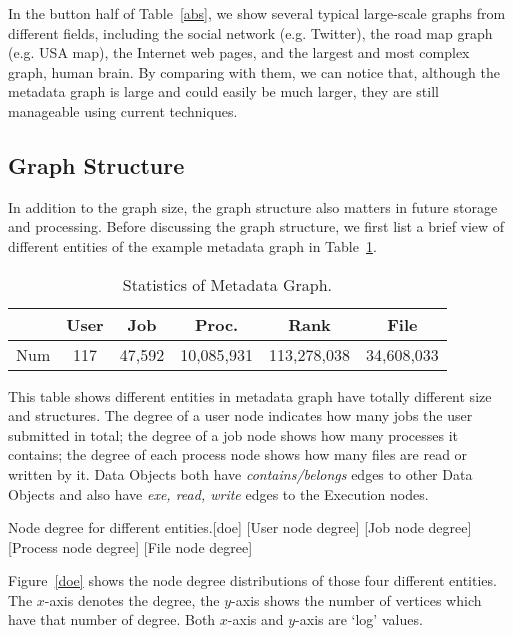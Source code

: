 In the button half of Table~\ref{abs}, we show several typical large-scale graphs from different fields, including the social network (e.g. Twitter), the road map graph (e.g. USA map), the Internet web pages, and the largest and most complex graph, human brain. By comparing with them, we can notice that, although the metadata graph is large and could easily be much larger, they are still manageable using current techniques.

\subsection{Graph Structure}
In addition to the graph size, the graph structure also matters in future storage and processing. Before discussing the graph structure, we first list a brief view of different entities of the example metadata graph in Table~\ref{smg}.

\begin{table}[h]
\caption{Statistics of Metadata Graph.}
  \label{smg}
\centering
\begin{tabular}{|c|c|c|c|c|c|}
\hline
 & User  & Job  & Proc.   & Rank     & File     \\ \hline
 Num & 117      & 47,592  & 10,085,931 & 113,278,038 & 34,608,033 \\ \hline
\end{tabular}
\end{table}

This table shows different entities in metadata graph have totally different size and structures. The degree of a user node indicates how many jobs the user submitted in total; the degree of a job node shows how many processes it contains; the degree of each process node shows how many files are read or written by it. Data Objects both have \textit{contains/belongs} edges to other Data Objects and also have \textit{exe, read, write} edges to the Execution nodes.

   \begin{Figure}{Node degree for different entities.}[doe]
     [User node degree]
     [Job node degree]\\     
     [Process node degree]
     [File node degree]
   \end{Figure}
    
Figure~\ref{doe} shows the node degree distributions of those four different entities. The $x$-axis denotes the degree, the $y$-axis shows the number of vertices which have that number of degree. Both $x$-axis and $y$-axis are `log' values. 

